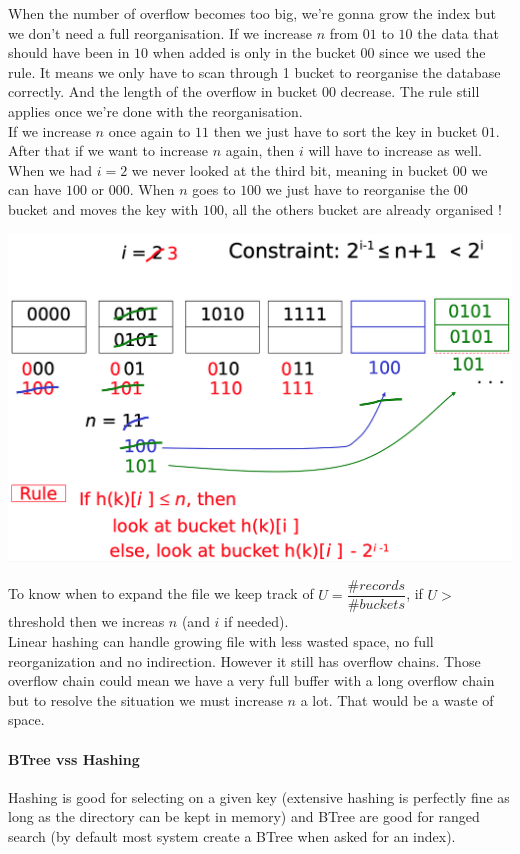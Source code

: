 \documentclass[12pt,a4paper]{article}
\begin{document}
When the number of overflow becomes too big, we're gonna grow the index but we don't need a full reorganisation. If we increase $n$ from $01$ to $10$ the data that should have been in $10$ when added is only in the bucket $00$ since we used the rule. It means we only have to scan through 1 bucket to reorganise the database correctly. And the length of the overflow in bucket $00$ decrease. The rule still applies once we're done with the reorganisation.\\
If we increase $n$ once again to $11$ then we just have to sort the key in bucket $01$. After that if we want to increase $n$ again, then $i$ will have to increase as well.\\

When we had $i = 2$ we never looked at the third bit, meaning in bucket $00$ we can have $100$ or $000$. When $n$ goes to $100$ we just have to reorganise the $00$ bucket and moves the key with $100$, all the others bucket are already organised !
\begin{center}
\includegraphics[scale=0.25]{img/img48.png}
\end{center}


To know when to expand the file we keep track of $U = \dfrac{\# records}{\# buckets}$, if $U >$ threshold then we increas $n$ (and $i$ if needed).\\
Linear hashing can handle growing file with less wasted space, no full reorganization and no indirection. However it still has overflow chains. 
Those overflow chain could mean we have a very full buffer with a long overflow chain but to resolve the situation we must increase $n$ a lot. That would be a waste of space.

\paragraph{BTree vss Hashing}
Hashing is good for selecting on a given key (extensive hashing is perfectly fine as long as the directory can be kept in memory) and BTree are good for ranged search (by default most system create a BTree when asked for an index).
\end{document}
